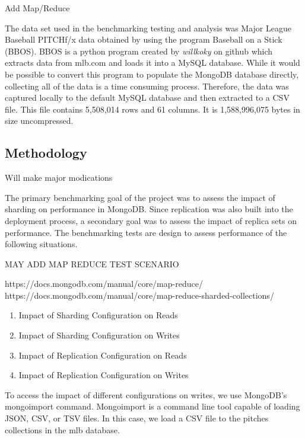 \documentclass[9pt,twocolumn,twoside]{styles/osajnl}
\begin{document}
Add Map/Reduce

The data set used in the benchmarking testing and analysis was Major League Baseball PITCHf/x data obtained by using the program Baseball on a Stick (BBOS).  \cite{www-bbos}  BBOS is a python program created by 
\emph{willkoky} on github which extracts data from mlb.com and loads it into a MySQL database.  While it would be possible to convert this program to populate the MongoDB database directly, collecting all of the data is a time consuming process. Therefore, the data was captured locally to the default MySQL database and then extracted to a CSV file.  This file contains 5,508,014 rows and 61 columns.  It is 1,588,996,075 bytes in size uncompressed.


\subsection{Methodology}

Will make major modications

The primary benchmarking goal of the project was to assess the impact of sharding on performance in MongoDB.  Since replication was also built into the deployment process, a secondary goal was to assess the impact of replica sets on performance.  The benchmarking tests are design to assess performance of the following situations.

MAY ADD MAP REDUCE TEST SCENARIO

https://docs.mongodb.com/manual/core/map-reduce/
https://docs.mongodb.com/manual/core/map-reduce-sharded-collections/

\vspace{-\topsep}
\begin{enumerate}
\item Impact of Sharding Configuration on Reads
\item Impact of Sharding Configuration on Writes
\item Impact of Replication Configuration on Reads
\item Impact of Replication Configuration on Writes
\end{enumerate}
\vspace{-\topsep}

To access the impact of different configurations on writes, we use MongoDB's mongoimport command.  Mongoimport is a command line tool capable of loading JSON, CSV, or TSV files. \cite{www-mongoimport} In this case, we load a CSV file to the pitches collections in the mlb database.
\end{document}
